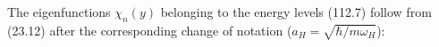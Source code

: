 The eigenfunctions $\chi_n(y)$ belonging to the energy levels (112.7) follow from (23.12) after the corresponding change of notation ($a_H=\sqrt{\hbar/m\omega_H}$):

